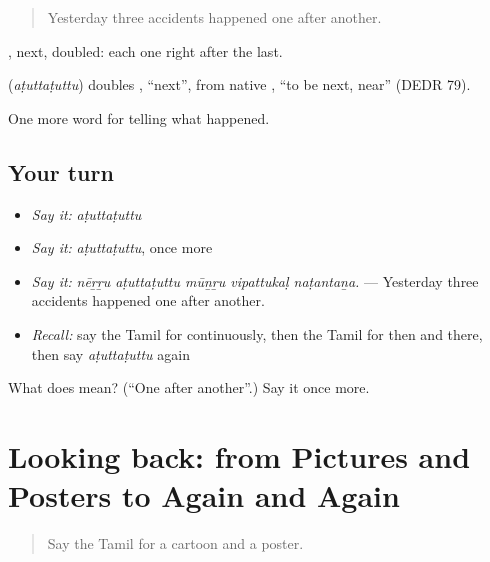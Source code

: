 \begin{quote}
Yesterday three accidents happened one after another.
\end{quote}

, next, doubled: each one right after the last.

\begin{cousinweb}
\textbf{} (\emph{aṭuttaṭuttu}) doubles , \textquotedblleft{}next\textquotedblright{}, from native , \textquotedblleft{}to be next, near\textquotedblright{} (DEDR 79).
\end{cousinweb}

\begin{grammarlens}[title={What you've built}]
One more word for telling what happened.
\end{grammarlens}

\subsection*{Your turn}
\begin{itemize}
\raggedright
  \item \emph{Say it:} \emph{aṭuttaṭuttu}
  \item \emph{Say it:} \emph{aṭuttaṭuttu}, once more
  \item \emph{Say it:} \emph{nēṟṟu aṭuttaṭuttu mūṉṟu vipattukaḷ naṭantaṉa.} — Yesterday three accidents happened one after another.
  \item \emph{Recall:} say the Tamil for continuously, then the Tamil for then and there, then say \emph{aṭuttaṭuttu} again
\end{itemize}

\begin{tcolorbox}[breakable,colback=teal!4,colframe=teal!35!black,title={Before you move on}]
What does  mean? (\textquotedblleft{}One after another\textquotedblright{}.) Say it once more.
\end{tcolorbox}
\section[(dialogue)]{Looking back: from Pictures and Posters to Again and Again}

\label{lesson:TA-R317-review-310-317}



\begin{quote}
Say the Tamil for a cartoon and a poster.
\end{quote}

